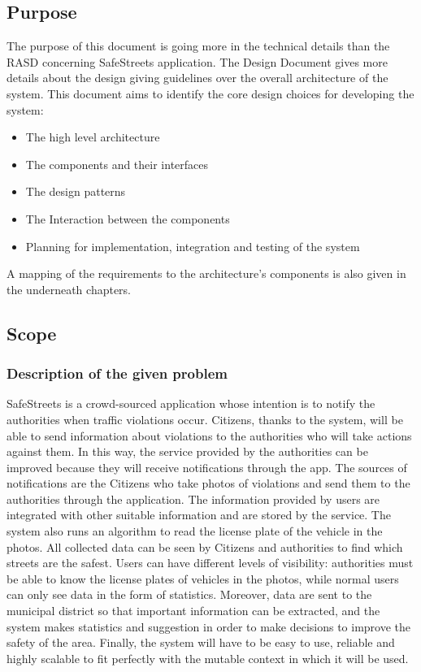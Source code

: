 
\subsection{Purpose}
The purpose of this document is going more in the technical details than the RASD concerning SafeStreets application.
\newline
The Design Document gives more details about the design giving guidelines over the overall architecture of the system.
This document  aims to identify the core design choices for developing the system:
\begin{itemize}
\item The high level architecture
\item The components and their interfaces
\item The design patterns
\item The Interaction between the components
\item Planning for implementation, integration and testing of the system
\end{itemize}
A mapping of the requirements to the architecture's components is also given in the underneath chapters. 

\subsection{Scope}
\subsubsection{Description of the given problem}
SafeStreets is a crowd-sourced application whose intention is to notify the authorities when traffic
violations occur. Citizens, thanks to the system, will be able to send information about violations to the
authorities who will take actions against them. In this way, the service provided by the authorities can be
improved because they will receive notifications through the app. The sources of notifications are the
Citizens who take photos of violations and send them to the authorities through
the application. The information provided by users are integrated with other suitable information and are
stored by the service. The system also runs an algorithm to read the license plate of the vehicle in the
photos. All collected data can be seen by Citizens and authorities to find which streets are the safest.
Users can have different levels of visibility: authorities must be able to know the license plates of vehicles
in the photos, while normal users can only see data in the form of statistics. Moreover, data are sent to the municipal district so that important information can be extracted, and the system makes statistics and suggestion in order to make decisions to improve the safety of the area. Finally, the system will have to be easy to use, reliable
and highly scalable to fit perfectly with the mutable context in which it will be used.


